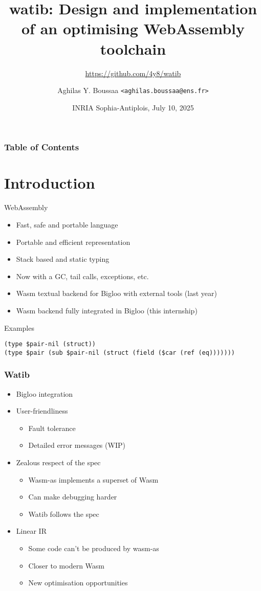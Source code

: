 \documentclass{beamer}
\author{Aghilas Y. Boussaa \texttt{<aghilas.boussaa@ens.fr>}}
\title{watib: Design and implementation of an optimising WebAssembly toolchain}
\subtitle{\url{https://github.com/4y8/watib}}
\institute{École normale supérieure}
\begin{document}
\frame{\titlepage}
\date{INRIA Sophia-Antiplois, July 10, 2025}
\begin{frame}
\frametitle{Table of Contents}
\tableofcontents
\end{frame}

\section{Introduction}
\begin{frame}{WebAssembly}
  \begin{itemize}
    \item Fast, safe and portable language
    \item Portable and efficient representation
    \item Stack based and static typing\pause
    \item Now with a GC, tail calls, exceptions, etc.\pause
    \item Wasm textual backend for Bigloo with external tools (last year)\pause
    \item Wasm backend fully integrated in Bigloo (this internship)
  \end{itemize}
\end{frame}
\begin{frame}[fragile]{Examples}
\begin{verbatim}
(type $pair-nil (struct))
(type $pair (sub $pair-nil (struct (field ($car (ref (eq)))))))
\end{verbatim}
\end{frame}
\begin{frame}
  \frametitle{Watib}
  \begin{itemize}
    \item Bigloo integration\pause
    \item User-friendliness
      \begin{itemize}
        \item Fault tolerance
        \item Detailed error messages (WIP)
      \end{itemize}\pause
    \item Zealous respect of the spec
      \begin{itemize}
        \item Wasm-as implements a superset of Wasm
        \item Can make debugging harder
        \item Watib follows the spec
      \end{itemize}\pause
    \item Linear IR
      \begin{itemize}
        \item Some code can't be produced by wasm-as
        \item Closer to modern Wasm
        \item New optimisation opportunities
      \end{itemize}
  \end{itemize}
\end{frame}
\end{document}
